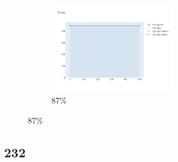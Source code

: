 \documentclass[12pt, fleqn]{report}                             %
\theoremstyle{break}                                            %
\begin{document}
\begin{figure}[ht!]
\begin{subfigure}[b]{0.4\linewidth}
          \includegraphics[width=0.6\textwidth]{Images/204/dia-d.png}
          \caption{87\%}
        \end{subfigure}
      \end{figure}


      \clearpage
      \subsection{232}
\end{document}
